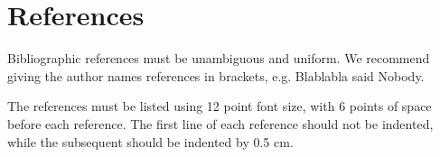 \documentclass[12pt]{article}
\begin{document}
\section{References}

Bibliographic references must be unambiguous and uniform.  We recommend giving
the author names references in brackets, e.g. Blablabla said Nobody.

The references must be listed using 12 point font size, with 6 points of space
before each reference. The first line of each reference should not be
indented, while the subsequent should be indented by 0.5 cm.



\end{document}
